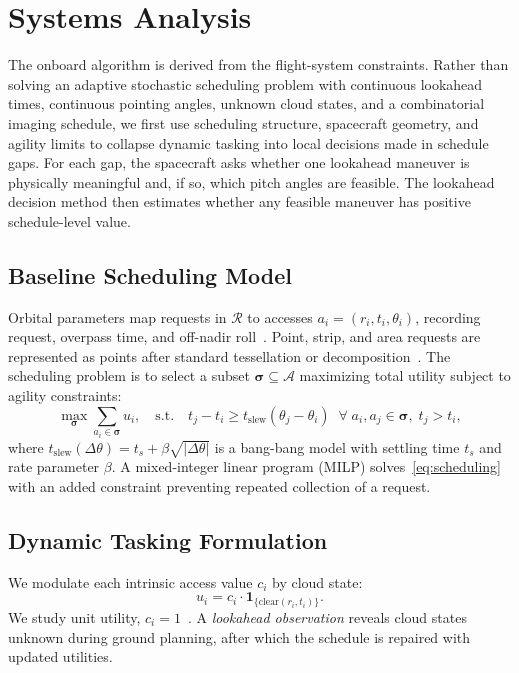 \section{Systems Analysis}
\label{sec:systems_analysis}

The onboard algorithm is derived from the flight-system constraints.
Rather than solving an adaptive stochastic scheduling problem with continuous lookahead times, continuous pointing angles, unknown cloud states, and a combinatorial imaging schedule, we first use scheduling structure, spacecraft geometry, and agility limits to collapse dynamic tasking into local decisions made in schedule gaps.
For each gap, the spacecraft asks whether one lookahead maneuver is physically meaningful and, if so, which pitch angles are feasible.
The lookahead decision method then estimates whether any feasible maneuver has positive schedule-level value.

\subsection{Baseline Scheduling Model}
\label{sec:scheduling}

Orbital parameters map requests in $\mathcal{R}$ to accesses $a_i=(r_i,t_i,\theta_i)$, recording request, overpass time, and off-nadir roll~\citep{eddy_task_2021}. Point, strip, and area requests are represented as points after standard tessellation or decomposition~\citep{eddy_task_2021, xu_multi-satellite_2020}.
The scheduling problem is to select a subset $\boldsymbol{\sigma} \subseteq \mathcal{A}$ maximizing total utility subject to agility constraints:
\begin{equation}
\max_{\boldsymbol{\sigma}} \sum_{a_i \in \boldsymbol{\sigma}} u_i, \quad
\text{s.t.} \quad t_j - t_i \geq t_{\mathrm{slew}}(\theta_j - \theta_i) \;\;\forall\; a_i, a_j \in \boldsymbol{\sigma},\; t_j > t_i,
\label{eq:scheduling}
\end{equation}
where $t_{\mathrm{slew}}(\Delta\theta)=t_s+\beta\sqrt{|\Delta\theta|}$ is a bang-bang model with settling time $t_s$ and rate parameter $\beta$. A mixed-integer linear program (MILP) solves~\eqref{eq:scheduling} with an added constraint preventing repeated collection of a request.

\subsection{Dynamic Tasking Formulation}
\label{sec:dt_formulation}

We modulate each intrinsic access value $c_i$ by cloud state:
\begin{equation}
u_i = c_i \cdot \mathbf{1}_{\{\text{clear}(r_i, t_i)\}}.
\end{equation}
We study unit utility, $c_i=1$~\citep{kacker_spacecraft_2025}. A \emph{lookahead observation} reveals cloud states unknown during ground planning, after which the schedule is repaired with updated utilities.

